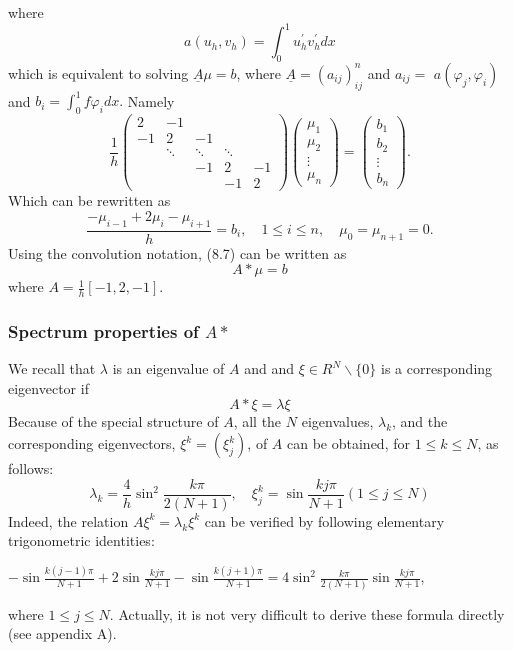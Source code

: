 \documentclass[10pt]{article}
\begin{document}
where
$$
a\left(u_{h}, v_{h}\right)=\int_{0}^{1} u_{h}^{\prime} v_{h}^{\prime} d x
$$
which is equivalent to solving $\underline{A} \mu=b$, where $\underline{A}=\left(a_{i j}\right)_{i j}^{n}$ and $a_{i j}=$ $a\left(\varphi_{j}, \varphi_{i}\right)$ and $b_{i}=\int_{0}^{1} f \varphi_{i} d x .$ Namely
$$
\frac{1}{h}\left(\begin{array}{ccccc}
2 & -1 & & & \\
-1 & 2 & -1 & & \\
& \ddots & \ddots & \ddots & \\
& & -1 & 2 & -1 \\
& & & -1 & 2
\end{array}\right)\left(\begin{array}{c}
\mu_{1} \\
\mu_{2} \\
\vdots \\
\mu_{n}
\end{array}\right)=\left(\begin{array}{c}
b_{1} \\
b_{2} \\
\vdots \\
b_{n}
\end{array}\right) .
$$
Which can be rewritten as
$$
\frac{-\mu_{i-1}+2 \mu_{i}-\mu_{i+1}}{h}=b_{i}, \quad 1 \leq i \leq n, \quad \mu_{0}=\mu_{n+1}=0 .
$$
Using the convolution notation, (8.7) can be written as
$$
A * \mu=b
$$
where $A=\frac{1}{h}[-1,2,-1]$.

\subsubsection{Spectrum properties of $A *$}
We recall that $\lambda$ is an eigenvalue of $A$ and and $\xi \in R^{N} \backslash\{0\}$ is a corresponding eigenvector if
$$
A * \xi=\lambda \xi
$$
Because of the special structure of $A$, all the $N$ eigenvalues, $\lambda_{k}$, and the corresponding eigenvectors, $\xi^{k}=\left(\xi_{j}^{k}\right)$, of $A$ can be obtained, for $1 \leq k \leq N$, as follows:
$$
\lambda_{k}=\frac{4}{h} \sin ^{2} \frac{k \pi}{2(N+1)}, \quad \xi_{j}^{k}=\sin \frac{k j \pi}{N+1}(1 \leq j \leq N)
$$
Indeed, the relation $A \xi^{k}=\lambda_{k} \xi^{k}$ can be verified by following elementary trigonometric identities:

$-\sin \frac{k(j-1) \pi}{N+1}+2 \sin \frac{k j \pi}{N+1}-\sin \frac{k(j+1) \pi}{N+1}=4 \sin ^{2} \frac{k \pi}{2(N+1)} \sin \frac{k j \pi}{N+1}$,

where $1 \leq j \leq N$. Actually, it is not very difficult to derive these formula directly (see appendix A).
\end{document}
